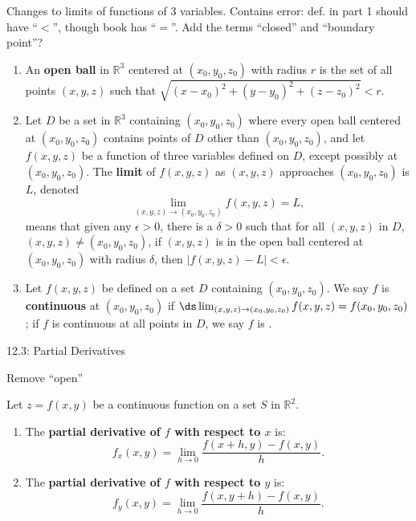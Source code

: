 \documentclass{article}
\begin{document}
Changes to limits of functions of 3 variables. Contains error: def. in part 1 should have ``$<$'', though book has ``$=$''. Add the terms ``closed'' and ``boundary point''?

{ 
\begin{enumerate}
\item An \textbf{open ball} in $\mathbb{R}^3$ centered at $(x_0,y_0,z_0)$ with radius $r$ is the set of all points $(x,y,z)$ such that $\sqrt{(x-x_0)^2+(y-y_0)^2+(z-z_0)^2} < r$.
\\

\item Let $D$ be a set in $\mathbb{R}^3$ containing $(x_0,y_0,z_0)$ where every open ball centered at $(x_0,y_0,z_0)$ contains points of $D$ other than $(x_0,y_0,z_0)$, and let $f(x,y,z)$ be a function of three variables defined on $D$, except possibly at  $(x_0,y_0,z_0)$. The \textbf{limit} of $f(x,y,z)$ as $(x,y,z)$ approaches $(x_0,y_0,z_0)$ is $L$, denoted 
$$\lim_{(x,y,z)\to (x_0,y_0,z_0)} f(x,y,z) = L,$$
means that given any $\epsilon >0$, there is a $\delta >0$ such that for all  $(x,y,z)$ in $D$, $(x,y,z)\neq(x_0,y_0,z_0)$, if $(x,y,z)$ is in the open ball centered at $(x_0,y_0,z_0)$ with radius $\delta$, then $|f(x,y,z) - L|< \epsilon$.\\

\item Let $f(x,y,z)$ be defined on a set $D$ containing $(x_0,y_0,z_0)$. We say $f$ is \textbf{continuous} at $(x_0,y_0,z_0)$ if $\ds \lim_{(x,y,z)\to (x_0,y_0,z_0)} f(x,y,z) = f(x_0,y_0,z_0)$; if $f$ is continuous at all points in $D$, we say $f$ is .
\end{enumerate}
}

12.3: Partial Derivatives

Remove ``open''
{Let $z=f(x,y)$ be a continuous function on a set $S$ in $\mathbb{R}^2$.
\begin{enumerate}
	\item The \textbf{partial derivative of $f$ with respect to $x$} is:
	$$f_x(x,y) = \lim_{h\to 0} \frac{f(x+h,y) - f(x,y)}h.$$
	\item The \textbf{partial derivative of $f$ with respect to $y$} is:
	$$f_y(x,y) = \lim_{h\to 0} \frac{f(x,y+h) - f(x,y)}h.$$
	
	\end{enumerate}
}
\end{document}
